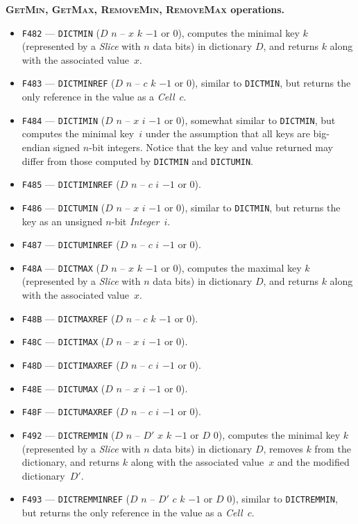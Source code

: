 \documentclass[12pt,oneside]{article}
\def\makepoint#1{\medbreak\noindent{\bf #1.\ }}
\def\nxsubpoint{\refstepcounter{subsubsection}%
  \smallbreak\makepoint{\thesubsubsection}}
\def\emb#1{\textbf{#1.}}
\begin{document}
\nxsubpoint\emb{\textsc{GetMin}, \textsc{GetMax}, \textsc{RemoveMin}, \textsc{RemoveMax} operations}
\begin{itemize}
\item {\tt F482} --- {\tt DICTMIN} ($D$ $n$ -- $x$ $k$ $-1$ or $0$), computes the minimal key $k$ (represented by a {\em Slice} with $n$ data bits) in dictionary $D$, and returns $k$ along with the associated value~$x$.
\item {\tt F483} --- {\tt DICTMINREF} ($D$ $n$ -- $c$ $k$ $-1$ or $0$), similar to {\tt DICTMIN}, but returns the only reference in the value as a {\em Cell\/}~$c$.
\item {\tt F484} --- {\tt DICTIMIN} ($D$ $n$ -- $x$ $i$ $-1$ or $0$), somewhat similar to {\tt DICTMIN}, but computes the minimal key~$i$ under the assumption that all keys are big-endian signed $n$-bit integers. Notice that the key and value returned may differ from those computed by {\tt DICTMIN} and {\tt DICTUMIN}.
\item {\tt F485} --- {\tt DICTIMINREF} ($D$ $n$ -- $c$ $i$ $-1$ or $0$).
\item {\tt F486} --- {\tt DICTUMIN} ($D$ $n$ -- $x$ $i$ $-1$ or $0$), similar to {\tt DICTMIN}, but returns the key as an unsigned $n$-bit {\em Integer}~$i$.
\item {\tt F487} --- {\tt DICTUMINREF} ($D$ $n$ -- $c$ $i$ $-1$ or $0$).
\item {\tt F48A} --- {\tt DICTMAX} ($D$ $n$ -- $x$ $k$ $-1$ or $0$), computes the maximal key $k$ (represented by a {\em Slice\/} with $n$ data bits) in dictionary $D$, and returns $k$ along with the associated value~$x$.
\item {\tt F48B} --- {\tt DICTMAXREF} ($D$ $n$ -- $c$ $k$ $-1$ or $0$).
\item {\tt F48C} --- {\tt DICTIMAX} ($D$ $n$ -- $x$ $i$ $-1$ or $0$).
\item {\tt F48D} --- {\tt DICTIMAXREF} ($D$ $n$ -- $c$ $i$ $-1$ or $0$).
\item {\tt F48E} --- {\tt DICTUMAX} ($D$ $n$ -- $x$ $i$ $-1$ or $0$).
\item {\tt F48F} --- {\tt DICTUMAXREF} ($D$ $n$ -- $c$ $i$ $-1$ or $0$).
\item {\tt F492} --- {\tt DICTREMMIN} ($D$ $n$ -- $D'$ $x$ $k$ $-1$ or $D$ $0$), computes the minimal key $k$ (represented by a {\em Slice} with $n$ data bits) in dictionary $D$, removes $k$ from the dictionary, and returns $k$ along with the associated value~$x$ and the modified dictionary~$D'$.
\item {\tt F493} --- {\tt DICTREMMINREF} ($D$ $n$ -- $D'$ $c$ $k$ $-1$ or $D$ $0$), similar to {\tt DICTREMMIN}, but returns the only reference in the value as a {\em Cell\/}~$c$.

\end{itemize}
\end{document}
